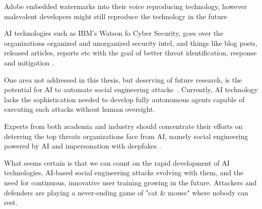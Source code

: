 

Adobe embedded watermarks into their voice reproducing technology, however malevolent developers might still reproduce the technology in the future \citep{king_AI_Crime_Interdisciplinary_Analysis_2019}

AI technologies such as IBM's Watson fo Cyber Security, goes over the organizations organized and unorganized security intel, and things like blog posts, released articles, reports etc with the goal of better threat identification, response and mitigation \citep{king_AI_Crime_Interdisciplinary_Analysis_2019}.



One area not addressed in this thesis, but deserving of future research, is the potential for AI to automate social engineering attacks~\citep{mirsky_Threat_Offensive_AI_Organizations_2023}. Currently, AI technology lacks the sophistication needed to develop fully autonomous agents capable of executing such attacks without human oversight.


Experts from both academia and industry should concentrate their efforts on deterring the top threats organizations face from AI, namely social engineering powered by AI and impersonation with deepfakes \citep{mirsky_Threat_Offensive_AI_Organizations_2023}.


What seems certain is that we can count on the rapid development of AI technologies, AI-based social engineering attacks evolving with them, and the need for continuous, innovative user training growing in the future. Attackers and defenders are playing a never-ending game of "cat \& mouse" where nobody can rest.


